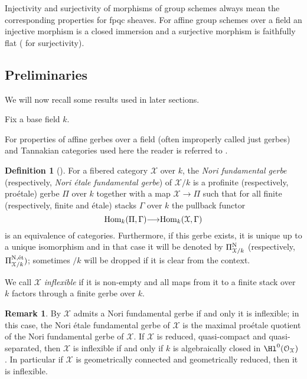 \documentclass[12pt,reqno]{amsart}
\theoremstyle{plain}
\theoremstyle{definition}
\newtheorem{defn}[thm]{Definition}
\newtheorem{rmk}[thm]{Remark}
\numberwithin{thm}{section}
\newcounter{x}\setcounter{x}{1}
\theoremstyle{plain}
\begin{document}
Injectivity and surjectivity of morphisms of group schemes always mean the corresponding properties for fpqc sheaves. For affine group schemes over a field an injective morphism is a closed immersion and a surjective morphism is faithfully flat 
(\cite[Theorem 15.5]{Wat} for surjectivity).

\subsection{Preliminaries}

We will now recall some results used in later sections.

Fix a base field $k$.

For properties of affine gerbes over a field (often improperly called just
gerbes) and Tannakian categories used here the reader is referred to
\cite[Appendix B]{TZ}.

 \begin{defn}[{\cite[Definition 5.1, Definition 5.3]{BV}}]\label{inflexible}
For a fibered category ${\mathcal{X}}$ over $k$, the \emph{Nori fundamental gerbe} 
(respectively, \emph{Nori \'etale fundamental gerbe}) of ${\mathcal{X}}/k$ is a profinite
(respectively, pro\'etale) gerbe $\Pi$ over $k$ together with a map ${\mathcal{X}}{\longrightarrow} \Pi$
such that for all finite (respectively, finite and \'etale) stacks $\Gamma$ over $k$
the pullback functor
 \[
 {{\rm Hom}}_k(\Pi,\Gamma){\longrightarrow} {{\rm Hom}}_k({\mathcal{X}},\Gamma)
 \]
 is an equivalence of categories. Furthermore, if this gerbe exists, it is unique up to a unique
isomorphism and in that case it will be denoted by $\Pi^{\textup{N}}_{{\mathcal{X}}/k}$ (respectively,
$\Pi^{{\textup{N}},{\textup{\'et}}}_{{\mathcal{X}}/k})$; sometimes $/k$ will be dropped if it is clear from the context.

We call ${{\mathcal X}}$ \emph{inflexible} if it is non-empty and all maps from it to a finite stack
over $k$ factors through a finite gerbe over $k$.
\end{defn}

\begin{rmk}\label{inflexible properties}
By \cite[p.~13, Theorem 5.7]{BV} ${{\mathcal X}}$ admits a Nori fundamental gerbe if and only
it is inflexible; in this case, the Nori \'etale fundamental gerbe of ${\mathcal{X}}$ is the
maximal pro\'etale quotient of the Nori fundamental gerbe of ${\mathcal{X}}$.
If ${\mathcal{X}}$ is reduced, quasi-compact and quasi-separated,
then ${\mathcal{X}}$ is inflexible if and only if $k$ is algebraically closed in
$\Hl^0({\mathcal{O}_{\mathcal{X}}})$ \cite[Theorem 4.4]{TZ}. In particular if ${\mathcal{X}}$ is geometrically
connected and geometrically reduced, then it is inflexible.
\end{rmk}
\end{document}
